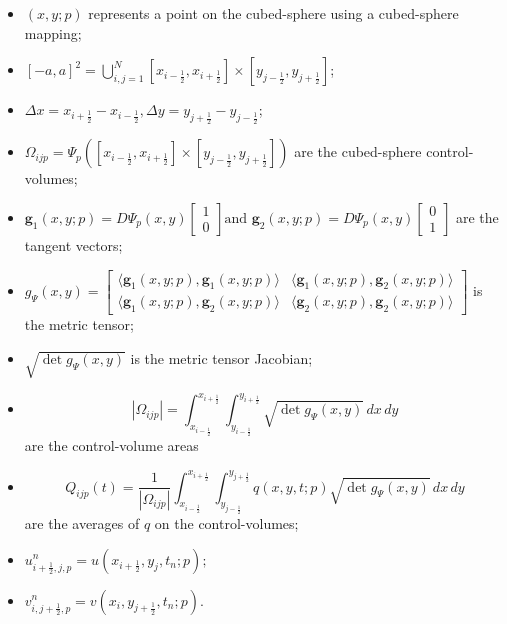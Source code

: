 \begin{itemize}
\item $(x,y;p)$ represents a point on the cubed-sphere using a cubed-sphere mapping;
\item $[-a,a]^2 = \bigcup_{i,j=1}^N [x_{i-\frac{1}{2}}, x_{i+\frac{1}{2}}] \times [y_{j-\frac{1}{2}}, y_{j+\frac{1}{2}}]$;
\item $\Delta x = x_{i+\frac{1}{2}}- x_{i-\frac{1}{2}},
\Delta y = y_{j+\frac{1}{2}}- y_{j-\frac{1}{2}}$;
\item $\Omega_{ijp} = \Psi_p([x_{i-\frac{1}{2}}, x_{i+\frac{1}{2}}] \times [y_{j-\frac{1}{2}}, y_{j+\frac{1}{2}}])$
are the cubed-sphere control-volumes;
\item
	$\boldsymbol{g}_{1}(x,y;p) = D\Psi_{p}(x,y)
	\begin{bmatrix}
		1 \\
		0
	\end{bmatrix} \text{and }
	\boldsymbol{g}_{2}(x,y;p) = D\Psi_{p}(x,y)
	\begin{bmatrix}
		0 \\
		1
	\end{bmatrix}
	$ are the tangent vectors;
\item
	$	g_{\Psi}(x,y) =
	\begin{bmatrix}
		\langle \boldsymbol{g}_{1}(x,y;p), \boldsymbol{g}_{1}(x,y;p) \rangle &
		\langle \boldsymbol{g}_{1}(x,y;p), \boldsymbol{g}_{2}(x,y;p) \rangle \\
		\langle \boldsymbol{g}_{1}(x,y;p), \boldsymbol{g}_{2}(x,y;p) \rangle  &
		\langle \boldsymbol{g}_{2}(x,y;p), \boldsymbol{g}_{2}(x,y;p) \rangle
	\end{bmatrix}
	$ is the metric tensor;
\item $\sqrt{\det{g_{\Psi}(x,y) }}$ is the metric tensor Jacobian;
\item $$|\Omega_{ijp}| = \int_{x_{i-\frac{1}{2}}}^{x_{i+\frac{1}{2}}} \int_{y_{i-\frac{1}{2}}}^{y_{i+\frac{1}{2}}}\sqrt{\det{g_{\Psi}(x,y) }} \,dx \,dy$$ are the control-volume areas

\item $$Q_{ijp}(t) = \frac{1}{|\Omega_{ijp}|}\int_{x_{i-\frac{1}{2}}}^{x_{i+\frac{1}{2}}}
\int_{y_{j-\frac{1}{2}}}^{y_{j+\frac{1}{2}}}  q(x,y,t;p) \sqrt{\det{g_{\Psi}(x,y) }}\,dx \,dy$$
are the averages of $q$ on the control-volumes;
\item $u_{i+\frac{1}{2},j,p}^n = u(x_{i+\frac{1}{2}},y_j,t_n;p);$
\item $v_{i,j+\frac{1}{2},p}^n = v(x_i,y_{j+\frac{1}{2}},t_n;p).$
\end{itemize}


